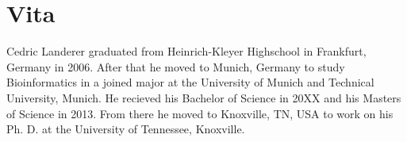 \chapter*{Vita} \label{ch:vita}
Cedric Landerer graduated from Heinrich-Kleyer Highschool in Frankfurt, Germany in 2006.
After that he moved to Munich, Germany to study Bioinformatics in a joined major at the University of Munich and Technical University, Munich.
He recieved his Bachelor of Science in 20XX and his Masters of Science in 2013.
From there he moved to Knoxville, TN, USA to work on his Ph. D. at the University of Tennessee, Knoxville.